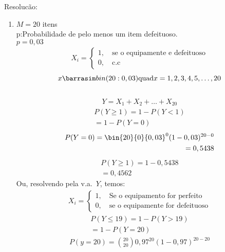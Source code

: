 \documentclass[11pt,a4paper]{book}
\begin{document}
\begin{description}
    \item{Resolucão:}
      \begin{enumerate}[label=(\alph*)]
        \item    $M=20$ itens\\
          p:Probabilidade de pelo menos um item defeituoso.\\
          $p=0,03$
          \begin{align*}
           X_i= \begin{cases}
             1, \quad \text{se o equipamente e defeituoso}\\
             0, \quad \text{c.c }
            \end{cases} 
          \end{align*}
          $$x \barrasim bin(20:0,03) \text{quad} x=1,2,3,4,5,\dots,20$$\\
          \begin{align*}
           Y=X_1 + X_2 + \ldots +X_20 
          \end{align*}
          \begin{align*}
            P(Y\ge 1)= 1-P(Y<1)\\
            =1-P(Y=0)
          \end{align*}
          \begin{align*}
            P(Y=0)= \bin{20}{0} {0,03}^0 (1-0,03)^{20-0}\\
            =0,5438
          \end{align*}
          \begin{align*}
            P(Y\ge 1)= 1-0,5438\\
            =0,4562
          \end{align*}
          Ou, resolvendo pela v.a.\ $Y$, temos:
\begin{align*}
           X_i= \begin{cases}
             1, \quad \text{Se o equipamento for perfeito} \\
             0, \quad \text{se o equipamente for defeituoso}
            \end{cases} 
          \end{align*}
          \begin{align*}
            P(Y\le 19)=1-P(Y>19)\\
            =1-P(Y=20)
          \end{align*}
          \begin{align*}
            P(y=20)=\binom{20}{20}0,97^{20}(1-0,97)^{20-20}\\

\end{align*}
\end{enumerate}
\end{description}
\end{document}
